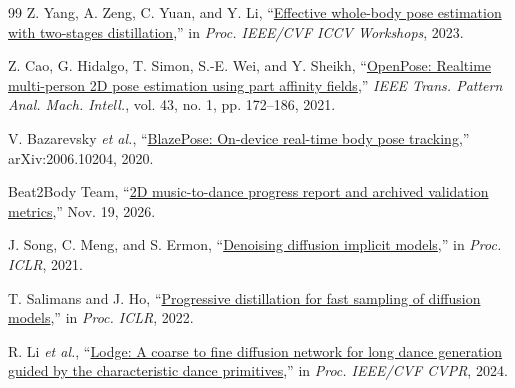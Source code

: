 \documentclass[conference,letterpaper]{IEEEtran}
\begin{document}
\begin{thebibliography}{99}
Z. Yang, A. Zeng, C. Yuan, and Y. Li, \textquotedblleft\href{https://arxiv.org/abs/2307.15880}{Effective whole-body pose estimation with two-stages distillation},'' in \emph{Proc. IEEE/CVF ICCV Workshops}, 2023.

Z. Cao, G. Hidalgo, T. Simon, S.-E. Wei, and Y. Sheikh, \textquotedblleft\href{https://doi.org/10.1109/TPAMI.2019.2929257}{OpenPose: Realtime multi-person 2D pose estimation using part affinity fields},'' \emph{IEEE Trans. Pattern Anal. Mach. Intell.}, vol. 43, no. 1, pp. 172--186, 2021.

V. Bazarevsky \emph{et al.}, \textquotedblleft\href{https://arxiv.org/abs/2006.10204}{BlazePose: On-device real-time body pose tracking},'' arXiv:2006.10204, 2020.

Beat2Body Team, \textquotedblleft\href{https://github.com/novaz03/beat2body/tree/cb66cc7b4f78f4409baee615d14b34a6879790ec/reports/2026-11-19_progress}{2D music-to-dance progress report and archived validation metrics},'' Nov. 19, 2026.

J. Song, C. Meng, and S. Ermon, \textquotedblleft\href{https://arxiv.org/abs/2010.02502}{Denoising diffusion implicit models},'' in \emph{Proc. ICLR}, 2021.

T. Salimans and J. Ho, \textquotedblleft\href{https://arxiv.org/abs/2202.00512}{Progressive distillation for fast sampling of diffusion models},'' in \emph{Proc. ICLR}, 2022.

R. Li \emph{et al.}, \textquotedblleft\href{https://openaccess.thecvf.com/content/CVPR2024/html/Li_Lodge_A_Coarse_to_Fine_Diffusion_Network_for_Long_Dance_CVPR_2024_paper.html}{Lodge: A coarse to fine diffusion network for long dance generation guided by the characteristic dance primitives},'' in \emph{Proc. IEEE/CVF CVPR}, 2024.

\end{thebibliography}
\end{document}
